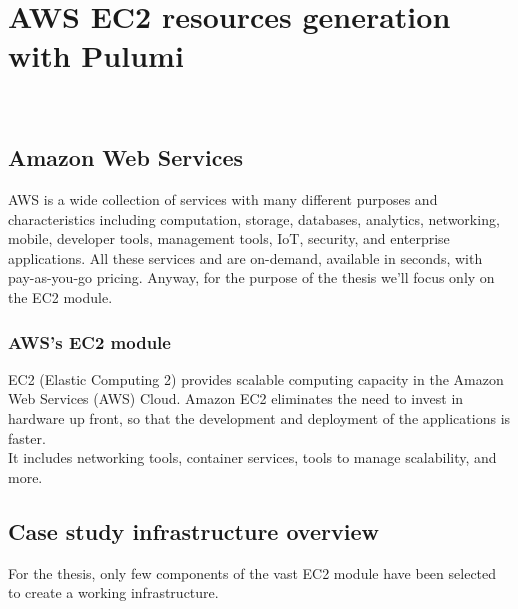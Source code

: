 
\chapter{AWS EC2 resources generation with Pulumi}
\label{cap:case-study}

\\

\section{Amazon Web Services}
AWS is a wide collection of services with many different purposes and characteristics including computation, storage, databases, analytics, networking, mobile, developer tools, management tools, IoT, security, and enterprise applications.
All these services and are on-demand, available in seconds, with pay-as-you-go pricing.
Anyway, for the purpose of the thesis we'll focus only on the EC2 module.

\subsection{AWS's EC2 module}
EC2 (Elastic Computing 2) provides scalable computing capacity in the Amazon Web Services (AWS) Cloud.
Amazon EC2 eliminates the need to invest in hardware up front, so that the development and deployment of the applications is faster.\\
It includes networking tools, container services, tools to manage scalability, and more.


\section{Case study infrastructure overview}
For the thesis, only few components of the vast EC2 module have been selected to create a working infrastructure.

